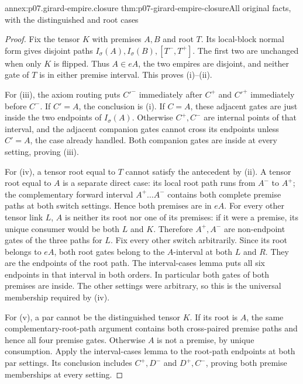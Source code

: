 \begin{annexitem}{annex:p07.girard-empire.closure}
 {thm:p07-girard-empire-closure}{All original facts, with the distinguished and root cases}
\begin{proof}
Fix the tensor \(K\) with premises \(A,B\) and root \(T\).
Its local-block normal form gives disjoint paths
\(I_\sigma(A),I_\sigma(B),[T^-,T^+]\).
The first two are unchanged when only \(K\) is flipped.
Thus \(A\in eA\), the two empires are disjoint, and neither gate
of \(T\) is in either premise interval. This proves (i)--(ii).

For (iii), the axiom routing puts \(C'^-\) immediately after \(C^+\)
and \(C'^+\) immediately before \(C^-\).
If \(C'=A\), the conclusion is (i).
If \(C=A\), these adjacent gates are just inside the two endpoints
of \(I_\sigma(A)\). Otherwise \(C^+,C^-\) are internal points of
that interval, and the adjacent companion gates cannot cross its
endpoints unless \(C'=A\), the case already handled.
Both companion gates are inside at every setting, proving (iii).

For (iv), a tensor root equal to \(T\) cannot satisfy the antecedent
by (ii). A tensor root equal to \(A\) is a separate direct case:
its local root path runs from \(A^-\) to \(A^+\); the complementary
forward interval \(A^+\ldots A^-\) contains both complete premise
paths at both switch settings. Hence both premises are in \(eA\).
For every other tensor link \(L\), \(A\) is neither its root nor
one of its premises: if it were a premise, its unique consumer would
be both \(L\) and \(K\). Therefore \(A^+,A^-\) are non-endpoint
gates of the three paths for \(L\).
Fix every other switch arbitrarily. Since its root belongs to \(eA\),
both root gates belong to the \(A\)-interval at both \(L\) and \(R\).
They are the endpoints of the root path. The interval-cases lemma
puts all six endpoints in that interval in both orders. In particular
both gates of both premises are inside. The other settings were
arbitrary, so this is the universal membership required by (iv).

For (v), a par cannot be the distinguished tensor \(K\).
If its root is \(A\), the same complementary-root-path argument
contains both cross-paired premise paths and hence all four premise
gates. Otherwise \(A\) is not a premise, by unique consumption.
Apply the interval-cases lemma to the root-path endpoints at both
par settings. Its conclusion includes \(C^+,D^-\) and \(D^+,C^-\),
proving both premise memberships at every setting.


\end{proof}
\end{annexitem}
